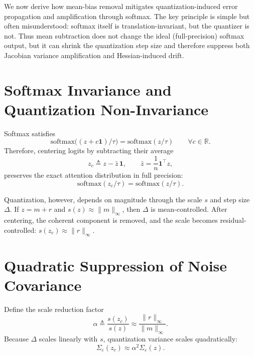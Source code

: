 We now derive how mean-bias removal mitigates quantization-induced error
propagation and amplification through softmax.
The key principle is simple but often misunderstood:
softmax itself is translation-invariant, but the quantizer is not.
Thus mean subtraction does not change the ideal (full-precision) softmax output,
but it can shrink the quantization step size and therefore suppress both
Jacobian variance amplification and Hessian-induced drift.

\section{Softmax Invariance and Quantization Non-Invariance}

Softmax satisfies
\begin{equation}
\mathrm{softmax}\big((z+c\mathbf{1})/\tau\big)=\mathrm{softmax}(z/\tau)
\qquad \forall c\in\mathbb{R}.
\end{equation}
Therefore, centering logits by subtracting their average
\begin{equation}
z_c \triangleq z - \bar z\,\mathbf{1},
\qquad
\bar z = \frac{1}{n}\mathbf{1}^\top z,
\end{equation}
preserves the exact attention distribution in full precision:
\begin{equation}
\mathrm{softmax}(z_c/\tau)=\mathrm{softmax}(z/\tau).
\end{equation}

Quantization, however, depends on magnitude through the scale $s$ and step size $\Delta$.
If $z=m+r$ and $s(z)\approx \|m\|_\infty$, then $\Delta$ is mean-controlled.
After centering, the coherent component is removed, and the scale becomes
residual-controlled: $s(z_c)\approx \|r\|_\infty$.

\section{Quadratic Suppression of Noise Covariance}

Define the scale reduction factor
\begin{equation}
\alpha \triangleq \frac{s(z_c)}{s(z)} \approx \frac{\|r\|_\infty}{\|m\|_\infty}.
\end{equation}
Because $\Delta$ scales linearly with $s$,
quantization variance scales quadratically:
\begin{equation}
\Sigma_\varepsilon(z_c) \approx \alpha^2 \Sigma_\varepsilon(z).
\end{equation}

